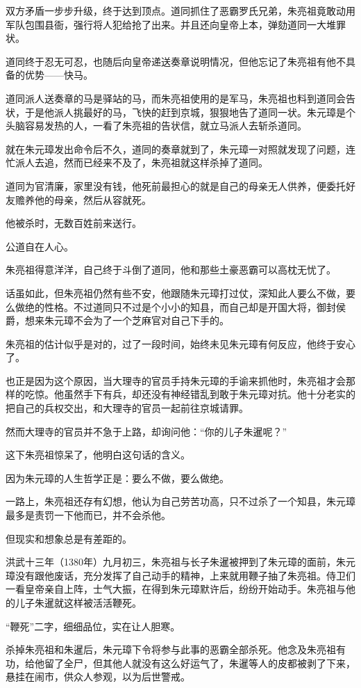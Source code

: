 \begin{multicols}{\theparacolNo}
		双方矛盾一步步升级，终于达到顶点。道同抓住了恶霸罗氏兄弟，朱亮祖竟敢动用军队包围县衙，强行将人犯给抢了出来。并且还向皇帝上本，弹劾道同一大堆罪状。

		道同终于忍无可忍，也随后向皇帝递送奏章说明情况，但他忘记了朱亮祖有他不具备的优势——快马。

		道同派人送奏章的马是驿站的马，而朱亮祖使用的是军马，朱亮祖也料到道同会告状，于是他派人挑最好的马，飞快的赶到京城，狠狠地告了道同一状。朱元璋是个头脑容易发热的人，一看了朱亮祖的告状信，就立马派人去斩杀道同。

		就在朱元璋发出命令后不久，道同的奏章就到了，朱元璋一对照就发现了问题，连忙派人去追，然而已经来不及了，朱亮祖就这样杀掉了道同。

		道同为官清廉，家里没有钱，他死前最担心的就是自己的母亲无人供养，便委托好友赡养他的母亲，然后从容就死。

		他被杀时，无数百姓前来送行。

		公道自在人心。

		朱亮祖得意洋洋，自己终于斗倒了道同，他和那些土豪恶霸可以高枕无忧了。

		话虽如此，但朱亮祖仍然有些不安，他跟随朱元璋打过仗，深知此人要么不做，要么做绝的性格。不过道同只不过是个小小的知县，而自己却是开国大将，御封侯爵，想来朱元璋不会为了一个芝麻官对自己下手的。

		朱亮祖的估计似乎是对的，过了一段时间，始终未见朱元璋有何反应，他终于安心了。

		也正是因为这个原因，当大理寺的官员手持朱元璋的手谕来抓他时，朱亮祖才会那样的吃惊。他虽然手下有兵，却还没有神经错乱到敢于朱元璋对抗。他十分老实的把自己的兵权交出，和大理寺的官员一起前往京城请罪。

		然而大理寺的官员并不急于上路，却询问他：“你的儿子朱暹呢？”

		这下朱亮祖惊呆了，他明白这句话的含义。

		因为朱元璋的人生哲学正是：要么不做，要么做绝。

		一路上，朱亮祖还存有幻想，他认为自己劳苦功高，只不过杀了一个知县，朱元璋最多是责罚一下他而已，并不会杀他。

		但现实和想象总是有差距的。

		洪武十三年（1380年）九月初三，朱亮祖与长子朱暹被押到了朱元璋的面前，朱元璋没有跟他废话，充分发挥了自己动手的精神，上来就用鞭子抽了朱亮祖。侍卫们一看皇帝亲自上阵，士气大振，在得到朱元璋默许后，纷纷开始动手。朱亮祖与他的儿子朱暹就这样被活活鞭死。

		“鞭死”二字，细细品位，实在让人胆寒。

		杀掉朱亮祖和朱暹后，朱元璋下令将参与此事的恶霸全部杀死。他念及朱亮祖有功，给他留了全尸，但其他人就没有这么好运气了，朱暹等人的皮都被剥了下来，悬挂在闹市，供众人参观，以为后世警戒。


\end{multicols}
